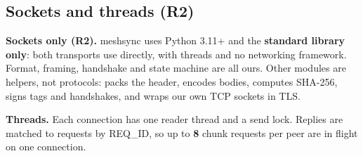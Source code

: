 \subsection{Sockets and threads (R2)}
\label{sec:r2}

\textbf{Sockets only (R2).} meshsync uses Python 3.11+ and the \textbf{standard library only}: both
transports use  directly, with threads and no networking framework. Format, framing,
handshake and state machine are all ours. Other modules are helpers, not protocols:  packs the header,  encodes bodies,
 computes SHA-256,  signs tags and handshakes, and  wraps our own
TCP sockets in TLS.

\textbf{Threads.} Each connection has one reader thread and a send lock. Replies are matched to
requests by REQ\_ID, so up to \textbf{8} chunk requests per peer are in flight on one connection.
